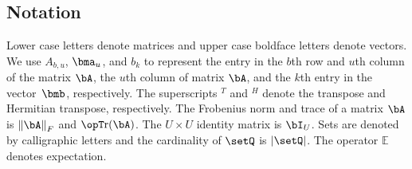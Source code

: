 \subsection{Notation}
%
Lower case letters denote matrices and upper case boldface letters denote vectors. We use $ A_{b,u} $,  $\bma_u$, and $ b_k $ to represent the entry in the $ b $th row and $ u $th column of the matrix $ \bA $, the $u$th column of matrix $\bA$, and the $ k $th entry in the vector~$ \bmb $, respectively. 
%
The superscripts $^T $ and $^H$ denote the transpose and Hermitian transpose, respectively. The Frobenius norm and trace of a matrix $\bA$ is $ \normfro{\bA} $ and $\Tr(\bA)$. The $U\times U$ identity matrix is $\bI_U$. 
%
Sets are denoted by calligraphic letters and the cardinality of $\setQ$ is $|\setQ|$. The operator $\mathbb{E}$ denotes expectation. 